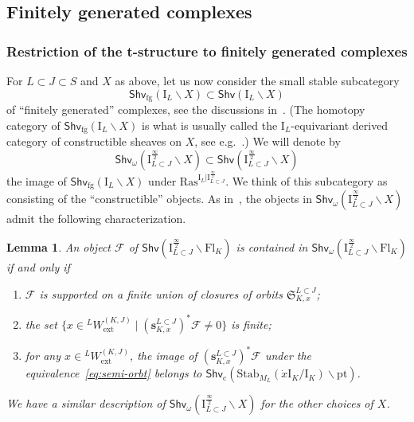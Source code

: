 \documentclass[11pt]{amsart}
\numberwithin{equation}{section}
\theoremstyle{plain}
\newtheorem{lem}[thm]{Lemma}
\theoremstyle{definition}
\newcommand{\sF}{{\mathcal F}}
\newcommand{\I}{{\mathrm I}}
\newcommand{\fS}{{\mathfrak{S}}}
\newcommand{\pt}{\mathrm{pt}}
\newcommand{\semi}{{{\frac{\infty}{2}}}}
\newcommand{\quar}{{{\frac{\infty}{4}}}}
\newcommand{\ex}{\mathrm{ext}}
\newcommand{\Shv}{\mathsf{Shv}}
\newcommand{\Shvc}{\mathsf{Shv}_{\mathrm{c}}}
\newcommand{\Shvfg}{\mathsf{Shv}_{\mathrm{fg}}}
\newcommand{\Ras}{\mathrm{Ras}}
\newcommand{\Fl}{\mathrm{Fl}}
\newcommand{\bs}{\mathbf{s}}
\begin{document}
\subsection{Finitely generated complexes}

\subsubsection{Restriction of the t-structure to finitely generated complexes} 
\label{sss:restriction-fg}

For $L\subset J\subset S$ and $X$ as above,
let us now consider the small stable subcategory
\[
\Shvfg(\I_L\backslash X) \subset \Shv(\I_L\backslash X)
\]
of ``finitely generated'' complexes, see the discussions in~\cite[\S 2.2 \& \S 2.5]{adr}. (The homotopy category of $\Shvfg(\I_L\backslash X)$ is what is usually called the $\I_L$-equivariant derived category of constructible sheaves on $X$, see e.g.~\cite{ARbook, ab, by}.)
We will denote by 
\[
\Shv_{\omega}\left(\I_{L\subset J}^{\semi}\backslash X\right) \subset \Shv\left(\I_{L\subset J}^{\semi}\backslash X\right)
\]
the image of $\Shvfg(\I_L\backslash X)$ under $\Ras^{\I_L | \I^\semi_{L \subset J}}$. 
We think of this subcategory as consisting of the ``constructible'' objects.
As in~\cite[\S 6.4]{adr}, the objects in $\Shv_{\omega}\left(\I_{L\subset J}^{\semi}\backslash X\right)$ admit the following characterization.

\begin{lem}
\label{lem:constr-complx}
An object $\sF$ of $\Shv\left(\I_{L\subset J}^{\semi}\backslash \Fl_K\right)$ is contained in $\Shv_{\omega}\left(\I_{L\subset J}^{\semi}\backslash \Fl_K\right)$ if and only if 
\begin{enumerate}
\item $\sF$ is supported on a finite union of closures of orbits $\fS^{L\subset J}_{K,x}$; 
\item the set $\{x\in {}^LW_\ex^{(K,J)}\mid (\bs^{L\subset J}_{K,x})^* \sF\neq 0\}$ is finite; 
\item for any $x\in {}^LW_\ex^{(K,J)}$, the image of $(\bs^{L\subset J}_{K,x})^* \sF$ under the equivalence~\eqref{eq:semi-orbt} belongs to $\Shvc \left( \mathrm{Stab}_{M_L}(\dot{x}\I_K/\I_K)\backslash \pt \right)$. 
\end{enumerate}
We have a similar description of $\Shv_{\omega}\left(\I_{L\subset J}^{\semi} \backslash X\right)$ for the other choices of $X$. 
\end{lem}
\end{document}
